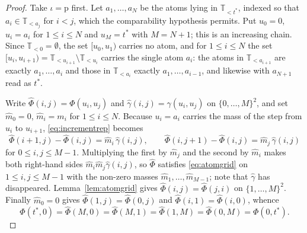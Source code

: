 \documentclass[11pt,a4paper]{article}
\theoremstyle{plain}
\theoremstyle{definition}
\theoremstyle{remark}
\newcommand{\T}{\mathbb{T}}                     %
\begin{document}
\begin{proof}
  Take $\iota = \mathrm{p}$ first.  Let $a_1,\dots,a_N$ be the atoms lying in
  $\T_{<t^*}$, indexed so that $a_i \in \T_{<a_j}$ for $i < j$, which the
  comparability hypothesis permits.  Put $u_0 = 0$, $u_i = a_i$ for
  $1 \leq i \leq N$ and $u_{M} = t^*$ with $M = N+1$; this is an increasing
  chain.  Since $\T_{<0} = \emptyset$, the set $[u_0,u_1)$ carries no atom, and
  for $1 \leq i \leq N$ the set $[u_i,u_{i+1}) = \T_{<u_{i+1}} \setminus
  \T_{<u_i}$ carries the single atom $a_i$: the atoms in $\T_{<a_{i+1}}$ are
  exactly $a_1,\dots,a_i$ and those in $\T_{<a_i}$ exactly $a_1,\dots,a_{i-1}$,
  and likewise with $a_{N+1}$ read as $t^*$.

  Write $\widehat\Phi(i,j) = \Phi(u_i,u_j)$ and
  $\widehat\gamma(i,j) = \gamma(u_i,u_j)$ on $\{0,\dots,M\}^2$, and set
  $\widehat m_0 = 0$, $\widehat m_i = m_i$ for $1 \leq i \leq N$.  Because
  $u_i = a_i$ carries the mass of the step from $u_i$ to $u_{i+1}$,
  \eqref{eq:incrementrep} becomes
  \[
    \widehat\Phi(i{+}1,j) - \widehat\Phi(i,j) = \widehat m_i\, \widehat\gamma(i,j) ,
    \qquad
    \widehat\Phi(i,j{+}1) - \widehat\Phi(i,j) = \widehat m_j\, \widehat\gamma(i,j)
  \]
  for $0 \leq i,j \leq M-1$.  Multiplying the first by $\widehat m_j$ and the
  second by $\widehat m_i$ makes both right-hand sides
  $\widehat m_i \widehat m_j \widehat\gamma(i,j)$, so $\widehat\Phi$ satisfies
  \eqref{eq:atomgrid} on $1 \leq i,j \leq M-1$ with the non-zero masses
  $\widehat m_1,\dots,\widehat m_{M-1}$; note that $\widehat\gamma$ has
  disappeared.  Lemma~\ref{lem:atomgrid} gives
  $\widehat\Phi(i,j) = \widehat\Phi(j,i)$ on $\{1,\dots,M\}^2$.  Finally
  $\widehat m_0 = 0$ gives $\widehat\Phi(1,j) = \widehat\Phi(0,j)$ and
  $\widehat\Phi(i,1) = \widehat\Phi(i,0)$, whence
  \[
    \Phi(t^*,0) = \widehat\Phi(M,0) = \widehat\Phi(M,1) = \widehat\Phi(1,M)
      = \widehat\Phi(0,M) = \Phi(0,t^*) .
  \]


\end{proof}
\end{document}
